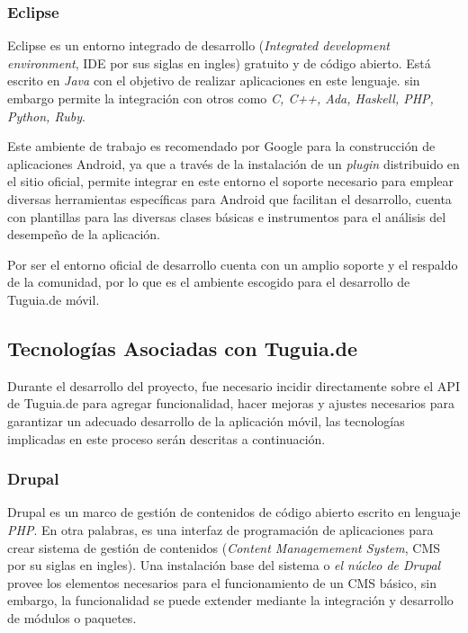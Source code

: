 \subsubsection{Eclipse}

Eclipse es un entorno integrado de desarrollo (\textit{Integrated development environment}, IDE por sus siglas en ingles) gratuito y de código abierto. Está escrito en \textit{Java} con el objetivo de realizar aplicaciones en este lenguaje. sin embargo permite la integración con otros como \textit{C, C++, Ada, Haskell, PHP, Python, Ruby}.

Este ambiente de trabajo es recomendado por Google para la construcción de aplicaciones Android, ya que a través de la instalación de un \textit{plugin} distribuido en el sitio oficial, permite integrar en este entorno el soporte necesario para emplear diversas herramientas específicas para Android que facilitan el desarrollo, cuenta con plantillas para las diversas clases básicas e instrumentos para el análisis del desempeño de la aplicación.

Por ser el entorno oficial de desarrollo cuenta con un amplio soporte y el respaldo de la comunidad, por lo que es el ambiente escogido para el desarrollo de Tuguia.de móvil.

\subsection{Tecnologías Asociadas con Tuguia.de} \label{subsect:Asociadas_movil}

Durante el desarrollo del proyecto, fue necesario incidir directamente sobre el API de Tuguia.de para agregar funcionalidad, hacer mejoras y ajustes necesarios para garantizar un adecuado desarrollo de la aplicación móvil, las tecnologías implicadas en este proceso serán descritas a continuación.

\subsubsection{Drupal}

Drupal es un marco de gestión de contenidos de código abierto escrito en lenguaje \textit{PHP}. En otra palabras, es una interfaz de programación de aplicaciones para crear sistema de gestión de contenidos (\textit{Content Managemement System}, CMS por su siglas en ingles). Una instalación base del sistema o \textit{el núcleo de Drupal} provee los elementos necesarios para el funcionamiento de un CMS básico, sin embargo, la funcionalidad se puede extender mediante la integración y desarrollo de módulos o paquetes\cite{TV10}.

